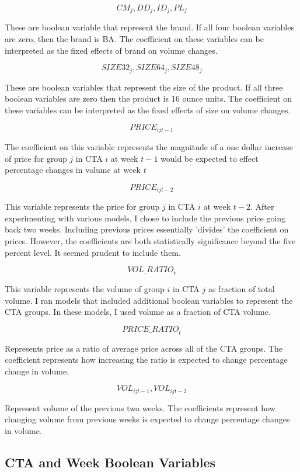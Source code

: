 \documentclass{article}
\begin{document}
$${CM}_{j}, {DD}_{j},{ID}_{j}, {PL}_{j} $$ 

These are boolean variable that represent the brand. If all four boolean variables are zero, then the brand is BA. The coefficient on these variables can be interpreted as the fixed effects of brand on volume changes.

$${SIZE32}_{j}, {SIZE64}_{j}, {SIZE48}_{j}$$ 

These are boolean variables that represent the size of the product. If all three boolean variables are zero then the product is 16 ounce units.  The coefficient on these variables can be interpreted as the fixed effects of size on volume changes.

$${PRICE}_{ijt-1} $$

The coefficient on this variable represents the magnitude of a one dollar increase of price for group $j$ in CTA $i$ at week $t-1$ would be expected to effect percentage changes in volume at week $t$

$${PRICE}_{ijt-2} $$ 

This variable represents the price for group $j$ in CTA $i$ at week $t-2$. After experimenting with various models, I chose to include the previous price going back two weeks. Including previous prices essentially 'divides' the coefficient on prices. However, the coefficients are both statistically significance beyond the five percent level. It seemed prudent to include them.

$${VOL\_RATIO}_t $$ 

This variable represents the volume of group $i$ in CTA $j$ as  fraction of total volume. I ran models that included additional boolean variables to represent the CTA groups. In these models, I used volume as a fraction of CTA volume.

$${PRICE\_RATIO}_{t} $$ 

Represents price as a ratio of average price across all of the CTA groups. The coefficient represents how increasing the ratio is expected to change percentage change in volume.

$${VOL}_{ijt-1}, {VOL}_{ijt-2} $$

Represent volume of the previous two weeks. The coefficients represent how changing volume from previous weeks is expected to change percentage changes in volume.


\subsection{CTA and Week Boolean Variables}
\end{document}
